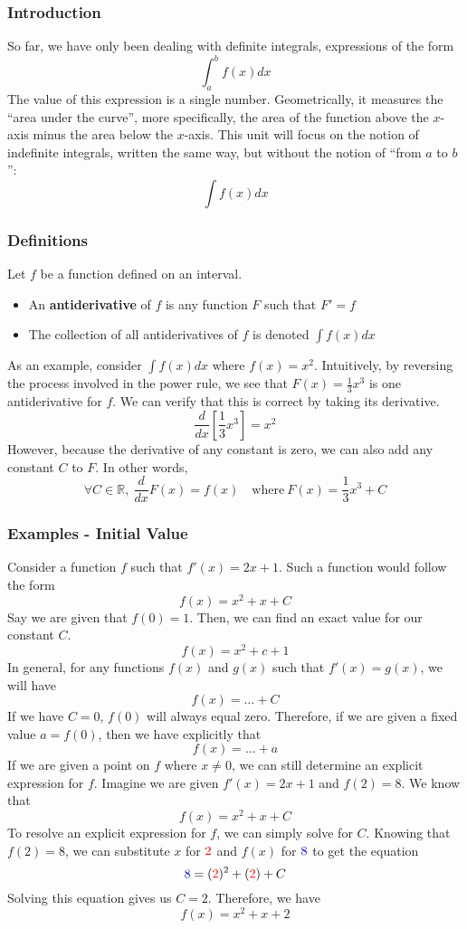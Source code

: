 \documentclass[10pt]{article}
\def\R{{\mathbb R}}
\newenvironment{definition}[1][]{\begin{tcolorbox}[colframe=_orange,colback=_orange2,title=Definition. \ifthenelse{\isempty{#1}}{}{(#1)}
]}{\end{tcolorbox}}
\begin{document}
\subsubsection{Introduction}
So far, we have only been dealing with definite integrals, expressions of the form
$$
    \int_a^bf(x)dx
$$
The value of this expression is a single number. Geometrically, it measures the ``area under the curve'', more specifically, the area of the function above the $x$-axis minus the area below the $x$-axis. This unit will focus on the notion of indefinite integrals, written the same way, but without the notion of ``from $a$ to $b$'':
$$
    \int f(x)dx
$$
\subsubsection{Definitions}
\begin{definition}
    Let $f$ be a function defined on an interval.
    \begin{itemize}
        \item An \textbf{antiderivative} of $f$ is any function $F$ such that $F'=f$
        \item The collection of all antiderivatives of $f$ is denoted $\displaystyle\int f(x)dx$
    \end{itemize}
\end{definition}
As an example, consider $\displaystyle \int f(x)dx$ where $f(x)=x^2$. Intuitively, by reversing the process involved in the power rule, we see that $F(x)=\frac{1}{3}x^3$ is one antiderivative for $f$. We can verify that this is correct by taking its derivative.
$$
    \frac{d}{dx}\left[\frac{1}{3}x^3\right]=x^2
$$
However, because the derivative of any constant is zero, we can also add any constant $C$ to $F$. In other words,
$$
    \forall C\in\R,~\frac{d}{dx}F(x)=f(x)\quad\text{where}~F(x)=\frac{1}{3}x^3+C
$$
\subsubsection{Examples - Initial Value}
Consider a function $f$ such that $f'(x)=2x+1$. Such a function would follow the form
$$
    f(x)=x^2+x+C
$$
Say we are given that $f(0)=1$. Then, we can find an exact value for our constant $C$.
$$
    f(x)=x^2+c+1
$$
In general, for any functions $f(x)$ and $g(x)$ such that $f'(x)=g(x)$, we will have
$$
    f(x)=\dots+C
$$
If we have $C=0$, $f(0)$ will always equal zero. Therefore, if we are given a fixed value $a=f(0)$, then we have explicitly that
$$
    f(x)=\dots+a
$$
If we are given a point on $f$ where $x\neq 0$, we can still determine an explicit expression for $f$. Imagine we are given $f'(x)=2x+1$ and $f(2)=8$. We know that
$$
    f(x)=x^2+x+C
$$
To resolve an explicit expression for $f$, we can simply solve for $C$. Knowing that $f(2)=8$, we can substitute $x$ for $\textcolor{red}{2}$ and $f(x)$ for $\textcolor{blue}{8}$ to get the equation
$$
    \textcolor{blue}{8}=(\textcolor{red}{2})^2+(\textcolor{red}{2})+C
$$
Solving this equation gives us $C=2$. Therefore, we have
$$
    f(x)=x^2+x+2
$$
\end{document}
